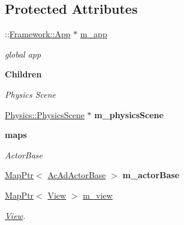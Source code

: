 \subsection*{Protected Attributes}
\begin{DoxyCompactItemize}
\item 
\hypertarget{classContent_1_1Scene_a59b375aa49b953be8ffb91195d019856}{
::\hyperlink{classFramework_1_1App}{Framework::App} $\ast$ \hyperlink{classContent_1_1Scene_a59b375aa49b953be8ffb91195d019856}{m\_\-app}}
\label{classContent_1_1Scene_a59b375aa49b953be8ffb91195d019856}

\begin{DoxyCompactList}\small\item\em global app \item\end{DoxyCompactList}\end{DoxyCompactItemize}
\begin{Indent}{\bf Children}\par
{\em \label{_amgrp64e4aca4297806247f62a7b5f8cbd3df}
 Physics Scene }\begin{DoxyCompactItemize}
\item 
\hypertarget{classContent_1_1Scene_a132258ff9389fea600fbec1597e34361}{
\hyperlink{classContent_1_1Physics_1_1PhysicsScene}{Physics::PhysicsScene} $\ast$ {\bfseries m\_\-physicsScene}}
\label{classContent_1_1Scene_a132258ff9389fea600fbec1597e34361}

\end{DoxyCompactItemize}
\end{Indent}
\begin{Indent}{\bf maps}\par
{\em \label{_amgrp7e94476d62556cc8501e3df5b8d6470d}
 ActorBase }\begin{DoxyCompactItemize}
\item 
\hypertarget{classContent_1_1Scene_a6b954053ab2128b9212e6a23ca594466}{
\hyperlink{classMapPtr}{MapPtr}$<$ \hyperlink{classContent_1_1Actor_1_1Admin_1_1ActorBase}{AcAdActorBase} $>$ {\bfseries m\_\-actorBase}}
\label{classContent_1_1Scene_a6b954053ab2128b9212e6a23ca594466}

\item 
\hypertarget{classContent_1_1Scene_a37989fc38d0fbf6076e3ab8b97766413}{
\hyperlink{classMapPtr}{MapPtr}$<$ \hyperlink{classContent_1_1View}{View} $>$ \hyperlink{classContent_1_1Scene_a37989fc38d0fbf6076e3ab8b97766413}{m\_\-view}}
\label{classContent_1_1Scene_a37989fc38d0fbf6076e3ab8b97766413}

\begin{DoxyCompactList}\small\item\em \hyperlink{classContent_1_1View}{View}. \item\end{DoxyCompactList}\end{DoxyCompactItemize}
\end{Indent}

